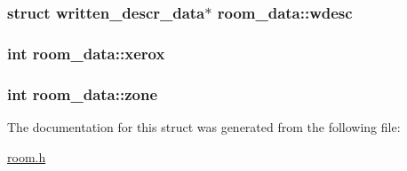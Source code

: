 \hypertarget{structroom__data_aa9dfc209119e69c508c5b6d77b1b106b}{
\subsubsection[{wdesc}]{\setlength{\rightskip}{0pt plus 5cm}struct {\bf written\-\_\-descr\-\_\-data}$\ast$ room\-\_\-data\-::wdesc}}\label{structroom__data_aa9dfc209119e69c508c5b6d77b1b106b}
\hypertarget{structroom__data_a7fadfb270bbed7f410206382e36cbec8}{
\subsubsection[{xerox}]{\setlength{\rightskip}{0pt plus 5cm}int room\-\_\-data\-::xerox}}\label{structroom__data_a7fadfb270bbed7f410206382e36cbec8}
\hypertarget{structroom__data_a383dffb948db697aa64c2dbcfe3872a9}{
\subsubsection[{zone}]{\setlength{\rightskip}{0pt plus 5cm}int room\-\_\-data\-::zone}}\label{structroom__data_a383dffb948db697aa64c2dbcfe3872a9}


The documentation for this struct was generated from the following file\-:\begin{DoxyCompactItemize}
\item 
\hyperlink{room_8h}{room.\-h}\end{DoxyCompactItemize}

